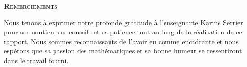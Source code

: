 \begin{frame}

	\begin{center}
		\textsc{{\bf Remerciements}}
	\end{center}

	Nous tenons à exprimer notre profonde gratitude à l’enseignante Karine Serrier pour son soutien, ses conseils et sa patience tout au long de la réalisation de ce rapport. Nous sommes reconnaissants de l’avoir eu comme encadrante et nous espérons que sa passion des mathématiques et sa bonne humeur se ressentiront dans le travail fourni.

\end{frame}
